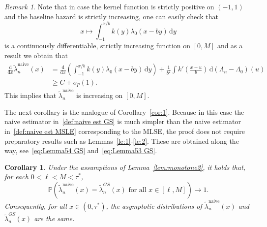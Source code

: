 \documentclass[11pt,reqno]{amsart}
\theoremstyle{definition}
\theoremstyle{plain}
\newtheorem{cor}[de]{Corollary}
\theoremstyle{remark}
\newtheorem{re}[de]{Remark}
\begin{document}
\begin{re}
Note that in case the kernel function is strictly positive on $(-1,1)$ and the baseline hazard is strictly increasing, one can easily check  that
\[
x\mapsto\int_{-1}^{x/b} k(y) \lambda_0(x-by)\,\mathrm{d}y
\]
is a continuously differentiable, strictly increasing function on $[0,M]$ and as a result we obtain that
\begin{equation}
\begin{split}
\frac{\mathrm{d}}{\mathrm{d}x}\tilde{\lambda}_n^{\mathrm{naive}}(x)
&=
\frac{\mathrm{d}}{\mathrm{d}x}\left(\int_{-1}^{x/b} k(y) \lambda_0(x-by)\,\mathrm{d}y  \right)
+
\frac{1}{b^2}\int k'\left(\frac{x-u}{b}\right)\,\mathrm{d}\left(\Lambda_n-\Lambda_0\right)(u)\\
&\geq C+o_P(1).
\end{split}
\end{equation}
This implies that $\tilde{\lambda}_n^{\mathrm{naive}}$ is increasing on $[0,M]$.
\end{re}
The next corollary is the analogue of Corollary~\ref{cor:1}.
Because in this case the naive estimator in~\eqref{def:naive est GS} is much simpler than
the naive estimator in~\eqref{def:naive est MSLE} corresponding to the MLSE,
the proof does not require preparatory results such as Lemmas~\ref{le:1}-\ref{le:2}.
These are obtained along the way, see~\eqref{eq:Lemma54 GS} and~\eqref{eq:Lemma53 GS}.
\begin{cor}
\label{cor:1-2}
Under the assumptions of Lemma~\ref{lem:monotone2}, it holds that, for each $0<\ell<M<\tau^*$,
\[
{\mathbb{P}}
\left(
\tilde{\lambda}_n^{\mathrm{naive}}(x)=\tilde{\lambda}_n^{GS}(x)\text{ for all } x\in[\ell,M]
\right)\to 1.
\]
Consequently, for all $x\in(0,\tau^*)$, the asymptotic distributions of $\tilde{\lambda}_n^{\mathrm{naive}}(x)$
and $\tilde{\lambda}_n^{GS}(x)$ are the same.
\end{cor}
\end{document}
